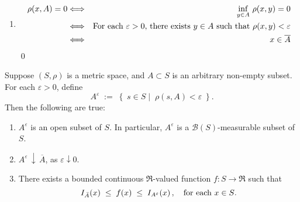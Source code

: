 \begin{enumerate}
\item
	\begin{eqnarray*}
	\rho(x,A) = 0
	&\Longleftrightarrow& \inf_{y\in A}\,\rho(x,y) = 0
	\\
	&\Longleftrightarrow& \textnormal{For each $\varepsilon > 0$, there exists $y \in A$ such that $\rho(x,y) < \varepsilon$}
	\\
	&\Longleftrightarrow& x \in \overline{A}
	\end{eqnarray*}
\qed
\end{enumerate}


\begin{lemma}
\label{LemmaAEpsilon}
\quad
Suppose $\left(S,\rho\right)$ is a metric space, and $A \subset S$ is an arbitrary non-empty subset.
For each $\varepsilon > 0$, define
\begin{equation*}
A^{\varepsilon} \;:=\;
\left\{\;
s \in S
\;\left\vert\;\;
\rho(s,A) < \varepsilon
\right.
\;\right\}.
\end{equation*}
Then the following are true:
\begin{enumerate}
\item
	$A^{\varepsilon}$ is an open subset of $S$. In particular, $A^{\varepsilon}$ is a $\mathcal{B}(S)$-measurable subset of $S$.
\item
	$A^{\varepsilon}\,\downarrow\,\overline{A}$, as $\varepsilon \downarrow 0$.
\item
	There exists a bounded continuous $\Re$-valued function $f : S \longrightarrow \Re$
	such that
	\begin{equation*}
	I_{\bar{A}}(x) \;\leq\; f(x) \;\leq\; I_{A^{\varepsilon}}(x)\,,
	\quad\textnormal{for each $x \in S$}.
	\end{equation*}
\end{enumerate}	
\end{lemma}
\proof
